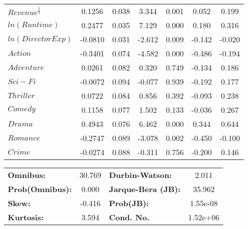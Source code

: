 \begin{center}
\begin{tabular}{lcccccc}
            \textbf{$Revenue^{\frac{1}{3}}$} &       0.1256  &        0.038     &     3.344  &         0.001        &        0.052    &        0.199     \\
            \textbf{$ln(Runtime)$}           &       0.2477  &        0.035     &     7.129  &         0.000        &        0.180    &        0.316     \\
            \textbf{$ln(Director Exp)$}      &      -0.0810  &        0.031     &    -2.612  &         0.009        &       -0.142    &       -0.020     \\
            \textbf{$Action$}                &      -0.3401  &        0.074     &    -4.582  &         0.000        &       -0.486    &       -0.194     \\
            \textbf{$Adventure$}             &       0.0261  &        0.082     &     0.320  &         0.749        &       -0.134    &        0.186     \\
            \textbf{$Sci-Fi$}                &      -0.0072  &        0.094     &    -0.077  &         0.939        &       -0.192    &        0.177     \\
            \textbf{$Thriller$}              &       0.0722  &        0.084     &     0.856  &         0.392        &       -0.093    &        0.238     \\
            \textbf{$Comedy$}                &       0.1158  &        0.077     &     1.502  &         0.133        &       -0.036    &        0.267     \\
            \textbf{$Drama$}                 &       0.4943  &        0.076     &     6.462  &         0.000        &        0.344    &        0.644     \\
            \textbf{$Romance$}               &      -0.2747  &        0.089     &    -3.078  &         0.002        &       -0.450    &       -0.100     \\
            \textbf{$Crime$}                 &      -0.0274  &        0.088     &    -0.311  &         0.756        &       -0.200    &        0.146     \\
            \bottomrule
            \end{tabular}
            \begin{tabular}{lclc}
            \textbf{Omnibus:}       & 30.769 & \textbf{  Durbin-Watson:     } &    2.011  \\
            \textbf{Prob(Omnibus):} &  0.000 & \textbf{  Jarque-Bera (JB):  } &   35.962  \\
            \textbf{Skew:}          & -0.416 & \textbf{  Prob(JB):          } & 1.55e-08  \\
            \textbf{Kurtosis:}      &  3.594 & \textbf{  Cond. No.          } & 1.52e+06  \\
            \bottomrule
            \end{tabular}
            \end{center}